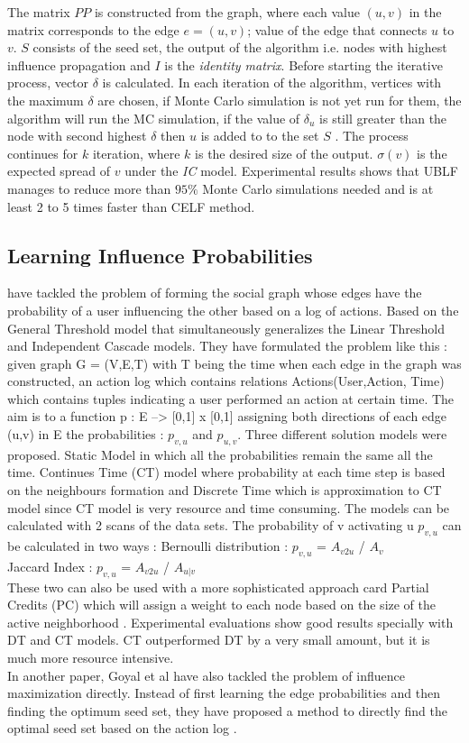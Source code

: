 \documentclass[english]{tktltiki}
\begin{document}
The matrix $PP$ is constructed from the graph, where each value $(u,v)$ in the matrix corresponds to the edge $e=(u,v)$; value of the edge that connects $u$ to $v$. $S$ consists of the seed set, the output of the algorithm i.e. nodes with highest influence propagation and $I$ is the \textit{identity matrix}. Before starting the iterative process, vector $\delta$ is calculated. In each iteration of the algorithm, vertices with the maximum $\delta$ are chosen, if Monte Carlo simulation is not yet run for them, the algorithm will run the MC simulation, if the value of $\delta_u$ is still greater than the node with second highest $\delta$ then $u$ is added to to the set $S$ . The process continues for $k$ iteration, where $k$ is the desired size of the output. $\sigma(v)$ is the expected spread of $v$ under the \textit{IC} model. Experimental results shows that UBLF manages to reduce more than $95\%$ Monte Carlo simulations needed and is at least 2 to 5 times faster than CELF method.

\subsection{Learning Influence Probabilities}
\label{subsec:learninginfprob}
\cite{goyal10} have tackled the problem of forming the social graph whose edges have the probability of a user
influencing the other based on a log of actions. Based on the General Threshold model that simultaneously 
generalizes the Linear Threshold and Independent Cascade models. They have formulated the problem like this :
given graph G = (V,E,T) with T being the time when each edge in the graph was constructed, an action log which contains relations Actions(User,Action, Time) which contains tuples indicating a user performed an action at certain time. The aim is to a function p : E --> [0,1] x [0,1] assigning both directions of each edge (u,v) in E the probabilities : $p_{v,u}$ and $p_{u,v}$.
Three different solution models were proposed. Static Model in which all the probabilities remain the same all the time. Continues Time (CT) model where probability at each time step is based on the neighbours formation and Discrete Time which is approximation to CT model since CT model is very resource and time consuming. 
The models can be calculated with 2 scans of the data sets. The probability of v activating u $p_{v,u}$ can be calculated in two ways : 
Bernoulli distribution :  $p_{v,u}$ =  $A_{v2u}$ / ${A_v}$ \\
Jaccard Index : $p_{v,u}$ =  $A_{v2u}$ / $A_{u|v}$ \\ 
These two can also be used with a more sophisticated approach card Partial Credits (PC) which will assign a 
weight to each node based on the size of the active neighborhood . Experimental evaluations show good results 
specially with DT and CT models. CT outperformed DT by a very small amount, but it is much more resource intensive. \\
In another paper, Goyal et al \cite{goyal11} have also tackled the problem of influence maximization directly. Instead of first learning the edge probabilities and then finding the optimum seed set, they have proposed a method to directly find the optimal seed set based on the action log .
\end{document}
